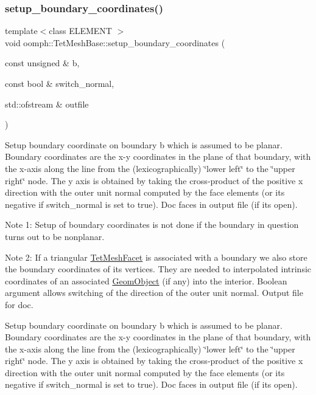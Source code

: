 \subsubsection{\texorpdfstring{setup\+\_\+boundary\+\_\+coordinates()}{setup\_boundary\_coordinates()}\hspace{0.1cm}{\footnotesize\ttfamily [3/4]}}
{\footnotesize\ttfamily template$<$class E\+L\+E\+M\+E\+NT $>$ \\
void oomph\+::\+Tet\+Mesh\+Base\+::setup\+\_\+boundary\+\_\+coordinates (\begin{DoxyParamCaption}\item[{const unsigned \&}]{b,  }\item[{const bool \&}]{switch\+\_\+normal,  }\item[{std\+::ofstream \&}]{outfile }\end{DoxyParamCaption})}



Setup boundary coordinate on boundary b which is assumed to be planar. Boundary coordinates are the x-\/y coordinates in the plane of that boundary, with the x-\/axis along the line from the (lexicographically) \char`\"{}lower left\char`\"{} to the \char`\"{}upper right\char`\"{} node. The y axis is obtained by taking the cross-\/product of the positive x direction with the outer unit normal computed by the face elements (or its negative if switch\+\_\+normal is set to true). Doc faces in output file (if it\textquotesingle{}s open). 

Note 1\+: Setup of boundary coordinates is not done if the boundary in question turns out to be nonplanar.

Note 2\+: If a triangular \hyperlink{classoomph_1_1TetMeshFacet}{Tet\+Mesh\+Facet} is associated with a boundary we also store the boundary coordinates of its vertices. They are needed to interpolated intrinsic coordinates of an associated \hyperlink{classoomph_1_1GeomObject}{Geom\+Object} (if any) into the interior. Boolean argument allows switching of the direction of the outer unit normal. Output file for doc.

Setup boundary coordinate on boundary b which is assumed to be planar. Boundary coordinates are the x-\/y coordinates in the plane of that boundary, with the x-\/axis along the line from the (lexicographically) \char`\"{}lower left\char`\"{} to the \char`\"{}upper right\char`\"{} node. The y axis is obtained by taking the cross-\/product of the positive x direction with the outer unit normal computed by the face elements (or its negative if switch\+\_\+normal is set to true). Doc faces in output file (if it\textquotesingle{}s open).

